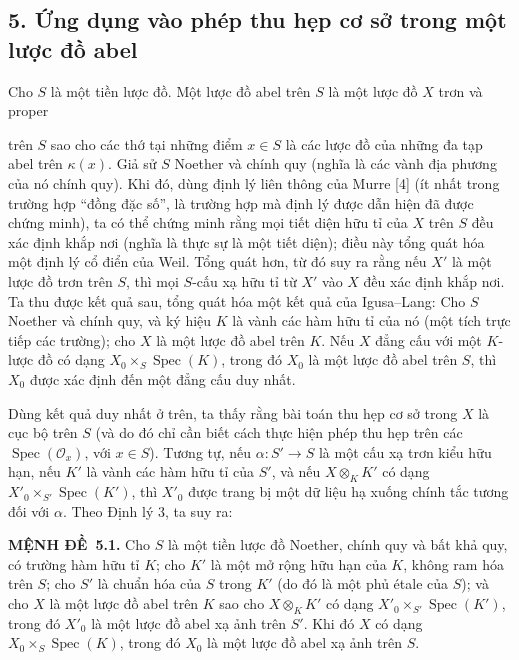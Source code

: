 \documentclass[11pt,twoside,openany]{book}
\numberwithin{equation}{section}
\newcommand{\src}[1]{%
  \phantomsection\hypertarget{src:\fgasourceid:#1}{}%
  \marginpar{\raggedleft\footnotesize\sffamily #1}%
}
\newcommand{\fgasourceid}{unset}
\newcommand{\result}[2]{\par\medskip\noindent\textbf{#1\if\relax\detokenize{#2}\relax\else\ #2\fi.}\quad}
\begin{document}
\subsection*{5. Ứng dụng vào phép thu hẹp cơ sở trong một lược đồ abel}

Cho $S$ là một tiền lược đồ. Một lược đồ abel trên $S$ là một lược đồ $X$ trơn
và proper

\src{324}
trên $S$ sao cho các thớ tại những điểm $x\in S$ là các lược đồ của những đa
tạp abel trên $\kappa(x)$. Giả sử $S$ Noether và chính quy (nghĩa là các vành
địa phương của nó chính quy). Khi đó, dùng định lý liên thông của Murre [4]
(ít nhất trong trường hợp ``đồng đặc số'', là trường hợp mà định lý được dẫn
hiện đã được chứng minh), ta có thể chứng minh rằng mọi tiết diện hữu tỉ của
$X$ trên $S$ đều xác định khắp nơi (nghĩa là thực sự là một tiết diện); điều
này tổng quát hóa một định lý cổ điển của Weil. Tổng quát hơn, từ đó suy ra
rằng nếu $X'$ là một lược đồ trơn trên $S$, thì mọi $S$-cấu xạ hữu tỉ từ $X'$
vào $X$ đều xác định khắp nơi. Ta thu được kết quả sau, tổng quát hóa một kết
quả của Igusa--Lang: Cho $S$ Noether và chính quy, và ký hiệu $K$ là
vành các hàm hữu tỉ của nó (một tích trực tiếp các trường); cho $X$ là một lược
đồ abel trên $K$. Nếu $X$ đẳng cấu với một $K$-lược đồ có dạng
$X_0\times_S\operatorname{Spec}(K)$, trong đó $X_0$ là một lược đồ abel trên
$S$, thì $X_0$ được xác định đến một đẳng cấu duy nhất.

Dùng kết quả duy nhất ở trên, ta thấy rằng bài toán thu hẹp cơ sở trong $X$ là
cục bộ trên $S$ (và do đó chỉ cần biết cách thực hiện phép thu hẹp trên các
$\operatorname{Spec}(\mathcal O_x)$, với $x\in S$). Tương tự, nếu
$\alpha:S'\longrightarrow S$ là một cấu xạ trơn kiểu hữu hạn, nếu $K'$ là
vành các hàm hữu tỉ của $S'$, và nếu $X\otimes_KK'$ có dạng
$X'_0\times_{S'}\operatorname{Spec}(K')$, thì $X'_0$ được trang bị một dữ liệu
hạ xuống chính tắc tương đối với $\alpha$. Theo Định lý 3, ta suy ra:

\result{MỆNH ĐỀ}{5.1} Cho $S$ là một tiền lược đồ Noether, chính quy và bất khả
quy, có trường hàm hữu tỉ $K$; cho $K'$ là một mở rộng hữu hạn của $K$, không
ram hóa trên $S$; cho $S'$ là chuẩn hóa của $S$ trong $K'$ (do đó là một phủ
étale của $S$); và cho $X$ là một lược đồ abel trên $K$ sao cho
$X\otimes_KK'$ có dạng $X'_0\times_{S'}\operatorname{Spec}(K')$, trong đó
$X'_0$ là một lược đồ abel xạ ảnh trên $S'$. Khi đó $X$ có dạng
$X_0\times_S\operatorname{Spec}(K)$, trong đó $X_0$ là một lược đồ abel xạ ảnh
trên $S$.
\end{document}
